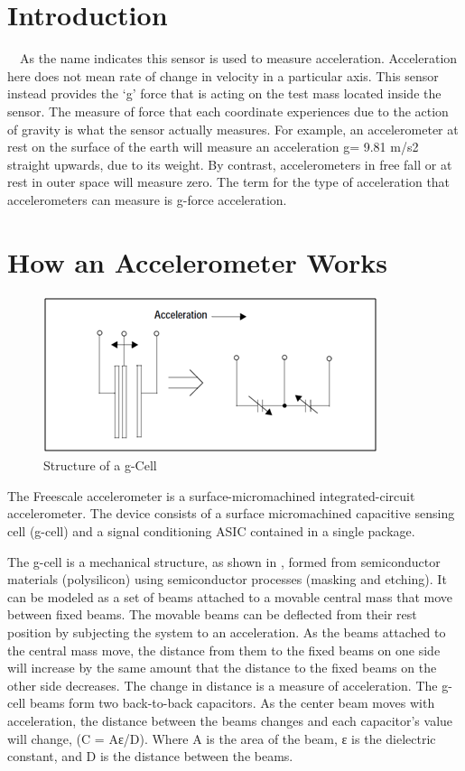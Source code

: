 \documentclass[a4paper,12 pt]{article}
\begin{document}
\section{Introduction}
\ \ As the name indicates this sensor is used to measure acceleration. Acceleration here does not mean rate of change in velocity in a particular axis. This sensor instead provides the ‘g’ force that is acting on the test mass located inside the sensor. The measure of force that each coordinate experiences due to the action of gravity is what the sensor actually measures. 
	For example, an accelerometer at rest on the surface of the earth will measure an acceleration g= 9.81 m/s2 straight upwards, due to its weight. By contrast, accelerometers in free fall or at rest in outer space will measure zero. The term for the type of acceleration that accelerometers can measure is g-force acceleration.

\section{How an Accelerometer Works } 
\vspace {5 mm}
\begin{figure}[h]
\begin{center}
\includegraphics[]{gcell.png}
\caption{Structure of a g-Cell}
\label{fig:1}
\end{center}
\end{figure}
\vspace{-20 pt}
The Freescale accelerometer is a surface-micromachined integrated-circuit accelerometer. The device consists of a surface micromachined capacitive sensing cell (g-cell) and a signal conditioning ASIC contained in a single package.


The g-cell is a mechanical structure, as shown in , formed from semiconductor materials (polysilicon) using semiconductor processes (masking and etching). It can be modeled as a set of beams attached to a movable central mass that move between fixed beams. The movable beams can be deflected from their rest position by subjecting the system to an acceleration. As the beams attached to the central mass move, the distance from them to the fixed beams on one side will increase by the same amount that the distance to the fixed beams on the other side decreases. The change in distance is a measure of acceleration. The g-cell beams form two back-to-back capacitors. As the center beam moves with acceleration, the distance between the beams changes and each capacitor's value will change, (C = Aε/D). Where A is the area of the beam, ε is the dielectric constant, and  D is the distance between the beams.
\end{document}
